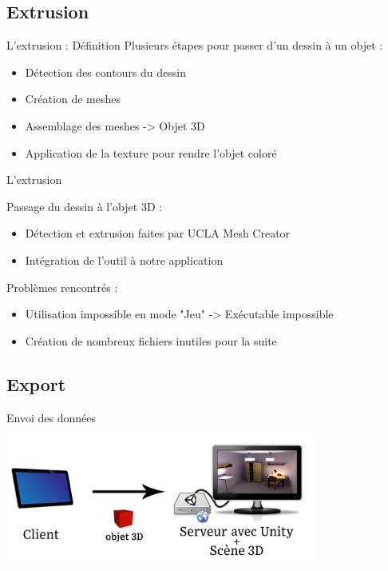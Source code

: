 \documentclass[a4paper,10pt]{beamer}
\begin{document}
	\subsection{Extrusion}
	\begin{frame}{L'extrusion : Définition}
		Plusieurs étapes pour passer d'un dessin à un objet :
		\begin{itemize}
			\item Détection des contours du dessin
			\item Création de meshes
			\item Assemblage des meshes -> Objet 3D
			\item Application de la texture pour rendre l'objet coloré
		\end{itemize}
	
	\end{frame}
		
	\begin{frame}{L'extrusion}
		
		Passage du dessin à l'objet 3D :
		\begin{itemize}
			\item Détection et extrusion faites par UCLA Mesh Creator
			\item Intégration de l'outil à notre application
		\end{itemize}
		\medbreak
		Problèmes rencontrés :
		\begin{itemize}
			\item Utilisation impossible en mode "Jeu" -> Exécutable impossible
			\item Création de nombreux fichiers inutiles pour la suite
		\end{itemize}
	\end{frame}
	\subsection{Export}
	\begin{frame}{Envoi des données}
		\centerline{\includegraphics[height=120pt]{images/network/sending_model2.png}}
	\end{frame}
	
\end{document}
